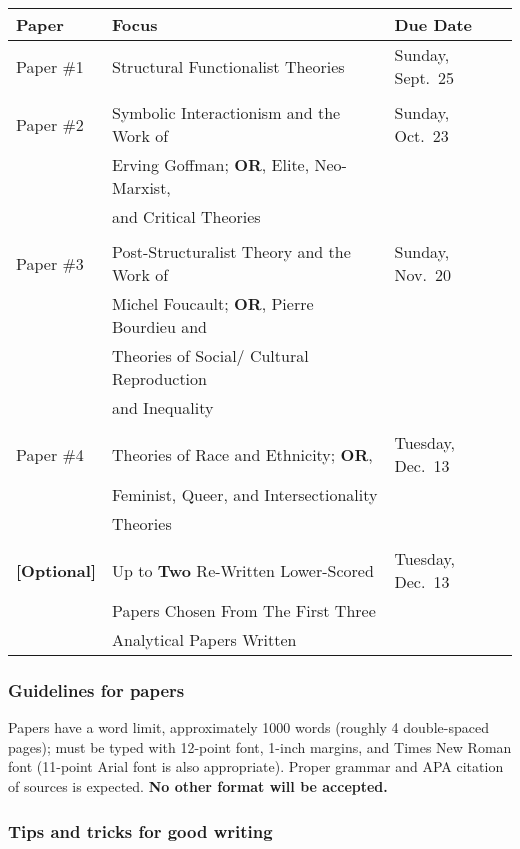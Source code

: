\documentclass[11pt,]{article}
\begin{document}
\begin{longtable}[]{@{}lll@{}}
\toprule()
\textbf{Paper} & \textbf{Focus} & \textbf{Due Date} \\
\midrule()
\endhead
Paper \#1 & Structural Functionalist Theories & Sunday, Sept.~25 \\
& & \\
Paper \#2 & Symbolic Interactionism and the Work of & Sunday, Oct.~23 \\
& Erving Goffman; \textbf{OR}, Elite, Neo-Marxist, & \\
& and Critical Theories & \\
& & \\
Paper \#3 & Post-Structuralist Theory and the Work of & Sunday,
Nov.~20 \\
& Michel Foucault; \textbf{OR}, Pierre Bourdieu and & \\
& Theories of Social/ Cultural Reproduction & \\
& and Inequality & \\
& & \\
Paper \#4 & Theories of Race and Ethnicity; \textbf{OR}, & Tuesday,
Dec.~13 \\
& Feminist, Queer, and Intersectionality & \\
& Theories & \\
& & \\
\textbf{{[}Optional{]}} & Up to \textbf{Two} Re-Written Lower-Scored &
Tuesday, Dec.~13 \\
& Papers Chosen From The First Three & \\
& Analytical Papers Written & \\
\bottomrule()
\end{longtable}

\hypertarget{guidelines-for-papers}{%
\subsubsection{Guidelines for papers}\label{guidelines-for-papers}}

Papers have a word limit, approximately 1000 words (roughly 4
double-spaced pages); must be typed with 12-point font, 1-inch margins,
and Times New Roman font (11-point Arial font is also appropriate).
Proper grammar and APA citation of sources is expected. \textbf{No other
format will be accepted.}

\hypertarget{tips-and-tricks-for-good-writing}{%
\subsubsection{Tips and tricks for good
writing}\label{tips-and-tricks-for-good-writing}}
\end{document}
